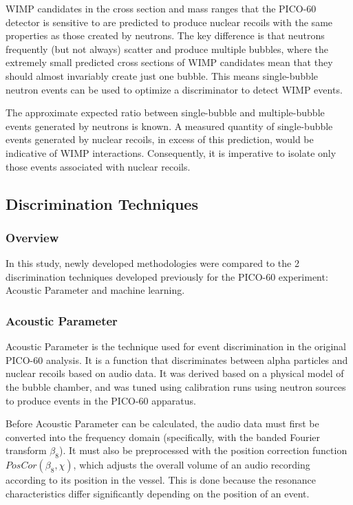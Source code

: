 \documentclass[10pt]{article}
\begin{document}
WIMP candidates in the cross section and mass ranges that the PICO-60 detector is sensitive to are predicted to produce nuclear recoils with the same properties as those created by neutrons. The key difference is that neutrons frequently (but not always) scatter and produce multiple bubbles, where the extremely small predicted cross sections of WIMP candidates mean that they should almost invariably create just one bubble. This means single-bubble neutron events can be used to optimize a discriminator to detect WIMP events.

The approximate expected ratio between single-bubble and multiple-bubble events generated by neutrons is known. A measured quantity of single-bubble events generated by nuclear recoils, in excess of this prediction, would be indicative of WIMP interactions. Consequently, it is imperative to isolate only those events associated with nuclear recoils.

\subsection{Discrimination Techniques}

\subsubsection{Overview}

In this study, newly developed methodologies were compared to the 2 discrimination techniques developed previously for the PICO-60 experiment: Acoustic Parameter and machine learning.

\subsubsection{Acoustic Parameter}

Acoustic Parameter is the technique used for event discrimination in the original PICO-60 analysis. It is a function that discriminates between alpha particles and nuclear recoils based on audio data. It was derived based on a physical model of the bubble chamber, and was tuned using calibration runs using neutron sources to produce events in the PICO-60 apparatus.

Before Acoustic Parameter can be calculated, the audio data must first be converted into the frequency domain (specifically, with the banded Fourier transform $\beta_{8}$). It must also be preprocessed with the position correction function $PosCor(\beta_{8}, \chi)$, which adjusts the overall volume of an audio recording according to its position in the vessel. This is done because the resonance characteristics differ significantly depending on the position of an event.
\end{document}
